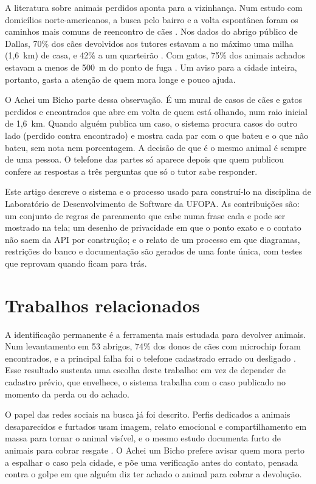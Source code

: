 \documentclass[12pt]{article}
\begin{document}
A literatura sobre animais perdidos aponta para a vizinhança. Num estudo com
domicílios norte-americanos, a busca pelo bairro e a volta espontânea foram os
caminhos mais comuns de reencontro de cães \cite{weiss2012}. Nos dados do abrigo
público de Dallas, 70\% dos cães devolvidos aos tutores estavam a no máximo uma
milha (1,6~km) de casa, e 42\% a um quarteirão \cite{kremer2021}. Com gatos, 75\%
dos animais achados estavam a menos de 500~m do ponto de fuga \cite{huang2018}.
Um aviso para a cidade inteira, portanto, gasta a atenção de quem mora longe e
pouco ajuda.

O Achei um Bicho parte dessa observação. É um mural de casos de cães e gatos
perdidos e encontrados que abre em volta de quem está olhando, num raio inicial
de 1,6~km. Quando alguém publica um caso, o sistema procura casos do outro lado
(perdido contra encontrado) e mostra cada par com o que bateu e o que não bateu,
sem nota nem porcentagem. A decisão de que é o mesmo animal é sempre de uma
pessoa. O telefone das partes só aparece depois que quem publicou confere as
respostas a três perguntas que só o tutor sabe responder.

Este artigo descreve o sistema e o processo usado para construí-lo na disciplina
de Laboratório de Desenvolvimento de Software da UFOPA. As contribuições são: um
conjunto de regras de pareamento que cabe numa frase cada e pode ser mostrado na
tela; um desenho de privacidade em que o ponto exato e o contato não saem da API
por construção; e o relato de um processo em que diagramas, restrições do banco
e documentação são gerados de uma fonte única, com testes que reprovam quando
ficam para trás.

\section{Trabalhos relacionados}

A identificação permanente é a ferramenta mais estudada para devolver animais. Num
levantamento em 53 abrigos, 74\% dos donos de cães com microchip foram
encontrados, e a principal falha foi o telefone cadastrado errado ou desligado
\cite{lord2009}. Esse resultado sustenta uma escolha deste trabalho: em vez de
depender de cadastro prévio, que envelhece, o sistema trabalha com o caso
publicado no momento da perda ou do achado.

O papel das redes sociais na busca já foi descrito. Perfis dedicados a animais
desaparecidos e furtados usam imagem, relato emocional e compartilhamento em massa
para tornar o animal visível, e o mesmo estudo documenta furto de animais para
cobrar resgate \cite{arathoon2024}. O Achei um Bicho prefere avisar quem mora perto a
espalhar o caso pela cidade, e põe uma verificação antes do contato, pensada
contra o golpe em que alguém diz ter achado o animal para cobrar a devolução.
\end{document}
